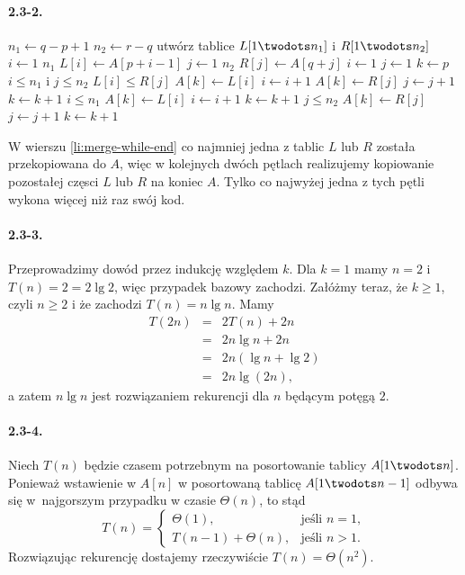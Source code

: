 \paragraph{2.3-2.}
\begin{codebox}
\li $n_1\gets q-p+1$
\li $n_2\gets r-q$
\li utwórz tablice $L[1\twodots n_1]$ i $R[1\twodots n_2]$
\li \For $i\gets 1$ \To $n_1$
\li     \Do
            $L[i]\gets A[p+i-1]$
        \End
\li \For $j\gets 1$ \To $n_2$
\li     \Do
            $R[j]\gets A[q+j]$
        \End
\li $i\gets 1$
\li $j\gets 1$
\li $k\gets p$
\li \While $i\le n_1$ i $j\le n_2$
\li     \Do
            \If $L[i]\le R[j]$
\li             \Then
                    $A[k]\gets L[i]$
\li                 $i\gets i+1$
\li             \Else
                    $A[k]\gets R[j]$
\li                 $j\gets j+1$
                \End
\li         $k\gets k+1$
        \End \label{li:merge-while-end}
\li \While $i\le n_1$
\li     \Do
            $A[k]\gets L[i]$
\li         $i\gets i+1$
\li         $k\gets k+1$
        \End
\li \While $j\le n_2$
\li     \Do
            $A[k]\gets R[j]$
\li         $j\gets j+1$
\li         $k\gets k+1$
        \End
\end{codebox}
W wierszu \ref{li:merge-while-end} co najmniej jedna z tablic $L$ lub $R$ została przekopiowana do $A$, więc w kolejnych dwóch pętlach  realizujemy kopiowanie pozostałej częsci $L$ lub $R$ na koniec $A$. Tylko co najwyżej jedna z tych pętli wykona więcej niż raz swój kod.

\paragraph{2.3-3.}
Przeprowadzimy dowód przez indukcję względem $k$. Dla $k=1$ mamy $n=2$ i $T(n)=2=2\lg 2$, więc przypadek bazowy zachodzi. Załóżmy teraz, że $k\ge 1$, czyli $n\ge 2$ i że zachodzi $T(n)=n\lg n$. Mamy
\begin{eqnarray*}
	T(2n) &=& 2T(n) + 2n \\
	&=& 2n\lg n+2n \\
	&=& 2n(\lg n+\lg 2) \\
	&=& 2n\lg(2n),
\end{eqnarray*}
a zatem $n\lg n$ jest rozwiązaniem rekurencji dla $n$ będącym potęgą $2$.

\paragraph{2.3-4.}
Niech $T(n)$ będzie czasem potrzebnym na posortowanie tablicy $A[1\twodots n]$. Ponieważ wstawienie w $A[n]$ w posortowaną tablicę $A[1\twodots n-1]$ odbywa się w~najgorszym przypadku w czasie $\Theta(n)$, to stąd
\[
	T(n) = \left\{\begin{array}{ll}
		\Theta(1), & \mbox{jeśli } n=1, \\
		T(n-1)+\Theta(n), & \mbox{jeśli } n>1.
	\end{array}\right.
\]
Rozwiązując rekurencję dostajemy rzeczywiście $T(n)=\Theta(n^2)$.

